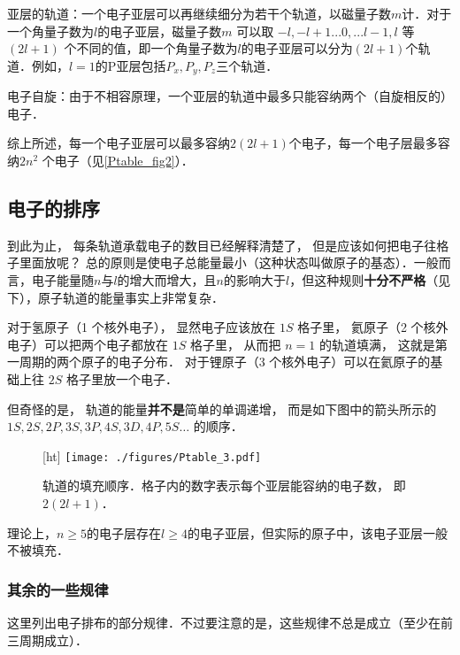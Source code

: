 亚层的轨道：一个电子亚层可以再继续细分为若干个轨道，以磁量子数$m$计．对于一个角量子数为$l$的电子亚层，磁量子数$m$ 可以取 $ - l, - l + 1...0,...l - 1,l$ 等 $(2l + 1)$ 个不同的值，即一个角量子数为$l$的电子亚层可以分为$(2l+1)$个轨道．例如，$l=1$的P亚层包括$P_x, P_y, P_z$三个轨道．

电子自旋：由于不相容原理，一个亚层的轨道中最多只能容纳两个（自旋相反的）电子．

综上所述，每一个电子亚层可以最多容纳$2(2l+1)$个电子，每一个电子层最多容纳$2n^2$ 个电子（见\autoref{Ptable_fig2}）．%

\subsection{电子的排序}
到此为止， 每条轨道承载电子的数目已经解释清楚了， 但是应该如何把电子往格子里面放呢？ 总的原则是使电子总能量最小（这种状态叫做原子的基态）．一般而言，电子能量随$n$与$l$的增大而增大，且$n$的影响大于$l$，但这种规则\textbf{十分不严格}（见下），原子轨道的能量事实上非常复杂．

对于氢原子（1 个核外电子）， 显然电子应该放在 $1S$ 格子里， 氦原子（2 个核外电子）可以把两个电子都放在 $1S$ 格子里， 从而把 $n=1$ 的轨道填满， 这就是第一周期的两个原子的电子分布． 对于锂原子（3 个核外电子）可以在氦原子的基础上往 $2S$ 格子里放一个电子． 

但奇怪的是， 轨道的能量\textbf{并不是}简单的单调递增， 而是如下图中的箭头所示的 $1S, 2S, 2P, 3S, 3P, 4S, 3D, 4P, 5S\dots$ 的顺序． 
\begin{figure}\label{Ptable_fig2}[ht]
\centering
\texttt{[image: ./figures/Ptable\_3.pdf]}
\caption{轨道的填充顺序．格子内的数字表示每个亚层能容纳的电子数， 即 $2(2l + 1)$．} 
\end{figure}


理论上，$n\ge5$的电子层存在$l\ge4$的电子亚层，但实际的原子中，该电子亚层一般不被填充．

\subsubsection{其余的一些规律}
这里列出电子排布的部分规律．不过要注意的是，这些规律不总是成立（至少在前三周期成立）．

